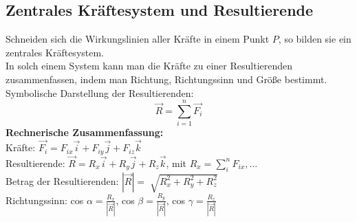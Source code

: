 \documentclass[a4paper,parskip=half*,DIV=7,fontsize=11pt]{scrartcl}
\begin{document}
\subsection{Zentrales Kräftesystem und Resultierende}
Schneiden sich die Wirkungslinien aller Kräfte in einem Punkt $P$, so bilden sie ein zentrales Kräftesystem.\\
In solch einem System kann man die Kräfte zu einer Resultierenden zusammenfassen, indem man Richtung, Richtungssinn und Größe bestimmt.\\
Symbolische Darstellung der Resultierenden: $$\overrightarrow{R}=\sum_{i=1}^n \overrightarrow{F_i}$$
\textbf{Rechnerische Zusammenfassung:}\\
Kräfte:  $\overrightarrow{F_i}=F_{ix}\overrightarrow{i}+F_{iy}\overrightarrow{j}+F_{iz}\overrightarrow{k}$\\
Resultierende: $\overrightarrow{R}=R_x\overrightarrow{i}+R_y\overrightarrow{j}+R_z\overrightarrow{k}$, mit $R_x=\sum_i^n F_{ix},...$\\
Betrag der Resultierenden: $|\overrightarrow{R}|=\sqrt[]{R_x^2+R_y^2+R_z^2}$\\
Richtungssinn: cos $\alpha=\frac{R_x}{|\overrightarrow{R}|}$, cos $\beta=\frac{R_y}{|\overrightarrow{R}|}$, cos $\gamma=\frac{R_z}{|\overrightarrow{R}|}$
\end{document}
